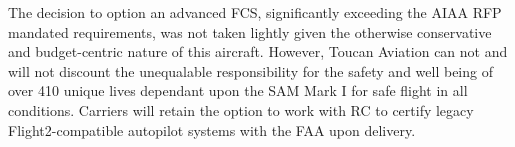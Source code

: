 The decision to option an advanced FCS, significantly exceeding the AIAA RFP \cite{RFP} mandated requirements, was not taken lightly given the otherwise conservative and budget-centric nature of this aircraft. However, Toucan Aviation can not and will not discount the unequalable responsibility for the safety and well being of over 410 unique lives dependant upon the SAM Mark I for safe flight in all conditions.  Carriers will retain the option to work with RC to certify legacy Flight2-compatible autopilot systems with the FAA upon delivery.   

